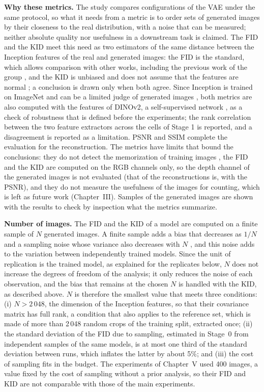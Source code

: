 \textbf{Why these metrics.} The study compares configurations of the VAE under the same protocol, so what it needs from a metric is to order sets of generated images by their closeness to the real distribution, with a noise that can be measured; neither absolute quality nor usefulness in a downstream task is claimed. The FID and the KID meet this need as two estimators of the same distance between the Inception features of the real and generated images: the FID is the standard, which allows comparison with other works, including the previous work of the group \cite{Gonzalez2026}, and the KID is unbiased and does not assume that the features are normal \cite{Binkowski2018}; a conclusion is drawn only when both agree. Since Inception is trained on ImageNet and can be a limited judge of generated images \cite{Stein2023}, both metrics are also computed with the features of DINOv2, a self-supervised network \cite{Oquab2023}, as a check of robustness that is defined before the experiments; the rank correlation between the two feature extractors across the cells of Stage 1 is reported, and a disagreement is reported as a limitation. PSNR and SSIM complete the evaluation for the reconstruction. The metrics have limits that bound the conclusions: they do not detect the memorization of training images \cite{Stein2023}, the FID and the KID are computed on the RGB channels only, so the depth channel of the generated images is not evaluated (that of the reconstructions is, with the PSNR), and they do not measure the usefulness of the images for counting, which is left as future work (Chapter~III). Samples of the generated images are shown with the results to check by inspection what the metrics summarize.

\textbf{Number of images.} The FID and the KID of a model are computed on a finite sample of $N$ generated images. A finite sample adds a bias that decreases as $1/N$ and a sampling noise whose variance also decreases with $N$ \cite{Chong2020}, and this noise adds to the variation between independently trained models. Since the unit of replication is the trained model, as explained for the replicates below, $N$ does not increase the degrees of freedom of the analysis; it only reduces the noise of each observation, and the bias that remains at the chosen $N$ is handled with the KID, as described above. $N$ is therefore the smallest value that meets three conditions: (i) $N>2\,048$, the dimension of the Inception features, so that their covariance matrix has full rank, a condition that also applies to the reference set, which is made of more than 2\,048 random crops of the training split, extracted once; (ii) the standard deviation of the FID due to sampling, estimated in Stage~0 from independent samples of the same models, is at most one third of the standard deviation between runs, which inflates the latter by about 5\%; and (iii) the cost of sampling fits in the budget. The experiments of Chapter~V used 400 images, a value fixed by the cost of sampling without a prior analysis, so their FID and KID are not comparable with those of the main experiments.

